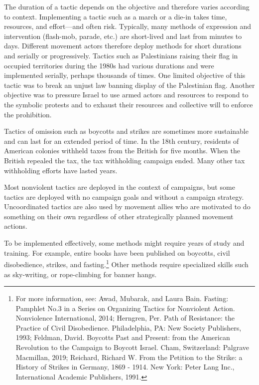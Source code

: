 \documentclass[twoside,a4paper,12pt,fleqn,openany]{extbook}
\begin{document}
The duration of a tactic depends on the objective and therefore varies according to context. Implementing a tactic such as a march or a die-in takes time, resources, and effort—and often risk. Typically, many methods of expression and intervention (flash-mob, parade, etc.) are short-lived and last from minutes to days. Different movement actors therefore deploy methods for short durations and serially or progressively. Tactics such as Palestinians raising their flag in occupied territories during the 1980s had various durations and were implemented serially, perhaps thousands of times. One limited objective of this tactic was to break an unjust law banning display of the Palestinian flag. Another objective was to pressure Israel to use armed actors and resources to respond to the symbolic protests and to exhaust their resources and collective will to enforce the prohibition.

Tactics of omission such as boycotts and strikes are sometimes more sustainable and can last for an extended period of time. In the 18th century, residents of American colonies withheld taxes from the British for five months. When the British repealed the tax, the tax withholding campaign ended. Many other tax withholding efforts have lasted years.

Most nonviolent tactics are deployed in the context of campaigns, but some tactics are deployed with no campaign goals and without a campaign strategy. Uncoordinated tactics are also used by movement allies who are motivated to do something on their own regardless of other strategically planned movement actions.

To be implemented effectively, some methods might require years of study and training. For example, entire books have been published on boycotts, civil disobedience, strikes, and fasting.\footnote{For more information, see: Awad, Mubarak, and Laura Bain. Fasting: Pamphlet No.3 in a Series on Organizing Tactics for Nonviolent Action. Nonviolence International, 2014; Herngren, Per. Path of Resistance: the Practice of Civil Disobedience. Philadelphia, PA: New Society Publishers, 1993; Feldman, David. Boycotts Past and Present: from the American Revolution to the Campaign to Boycott Israel. Cham, Switzerland: Palgrave Macmillan, 2019; Reichard, Richard W. From the Petition to the Strike: a History of Strikes in Germany, 1869 - 1914. New York: Peter Lang Inc., International Academic Publishers, 1991.} Other methods require specialized skills such as sky-writing, or rope-climbing for banner hangs.
\end{document}
